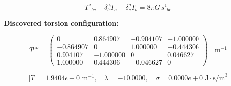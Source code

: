 
\begin{equation}
  T^a{}_{bc} + \delta^a_b T_c - \delta^a_c T_b = 8\pi G \, s^a{}_{bc}
\end{equation}

\textbf{Discovered torsion configuration:}

\begin{equation}
  T^{\mu\nu} = \begin{pmatrix}
    0 & 0.864907 & -0.904107 & -1.000000 \\
    -0.864907 & 0 & 1.000000 & -0.444306 \\
    0.904107 & -1.000000 & 0 & 0.046627 \\
    1.000000 & 0.444306 & -0.046627 & 0
  \end{pmatrix} \quad \text{m}^{-1}
\end{equation}

\begin{equation}
  |T| = 1.9404e+0 \text{ m}^{-1}, \quad
  \lambda = -10.0000, \quad
  \sigma = 0.0000e+0 \text{ J}\cdot\text{s/m}^3
\end{equation}